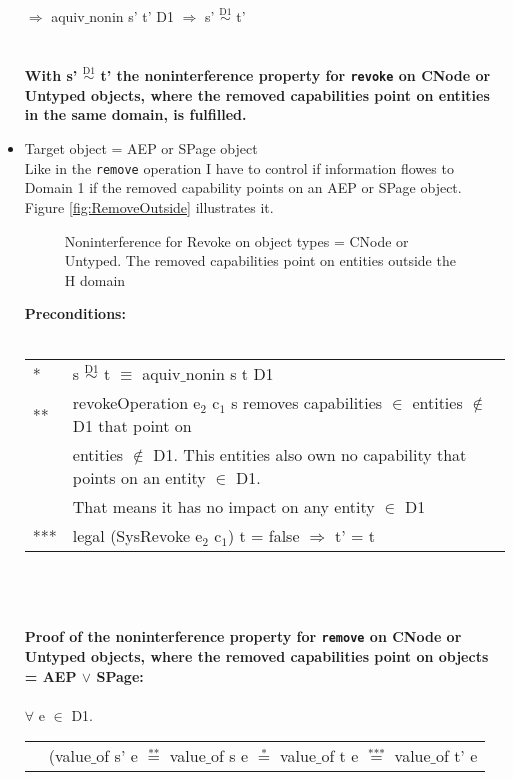 \begin{itemize}
$\Rightarrow$ aquiv$\_$nonin s' t' D1 $\Rightarrow$ s' $\overset{\text{D1}}{\sim}$ t' \\ \\ \\
\textbf{With s' $\overset{\text{D1}}{\sim}$ t' the noninterference property for \texttt{revoke} on CNode or Untyped objects, where the removed capabilities point on entities in the same domain, is fulfilled.}  
\clearpage
\item Target object = AEP or SPage object \\
Like in the \texttt{remove} operation I have to control if information flowes to Domain 1 if the removed capability points on an AEP or SPage object. Figure \ref{fig:RemoveOutside} illustrates it. 
\begin{flushleft}
\begin{figure}[H]
\caption{Noninterference for Revoke on object types = CNode or Untyped. The removed capabilities point on entities outside the H domain}
\label{fig:RevokeOutside}
\end{figure}
\end{flushleft}
\textbf{Preconditions:} \\ \\
\begin{tabular}{ll}
* & s $\overset{\text{D1}}{\sim}$ t $\equiv$ aquiv$\_$nonin s t D1	\\ 
** & revokeOperation e$_2$ c$_1$ s removes capabilities $\in$ entities $\notin$ D1 that point on \\
& entities $\notin$ D1. This entities also own no capability that points on an entity $\in$ D1. \\
& That means it has no impact on any entity $\in$ D1 \\ 
*** & legal (SysRevoke e$_2$ c$_1$) t = false $\Rightarrow$ t' = t
\end{tabular} \\ \\ \\
\textbf{Proof of the noninterference property for \texttt{remove} on CNode or Untyped objects, where the removed capabilities point on objects = AEP $\vee$ SPage:}\\ \\
$\forall$ e $\in$ D1. \\
\begin{tabular}{ll}
& (value$\_$of s' e $\overset{\text{**}}{=}$ value$\_$of s e $\overset{\text{*}}{=}$ value$\_$of t e $\overset{\text{***}}{=}$ value$\_$of t' e \\

\end{tabular}
\end{itemize}
